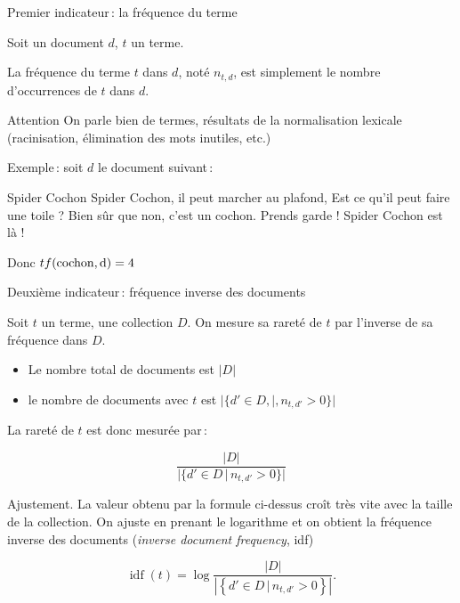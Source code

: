 \begin{frame}[fragile]{Premier indicateur\,: la \alert{fréquence du terme}}

Soit un document $d$, $t$ un terme. 

\vfill

La \alert{fréquence} du terme $t$ dans $d$,  noté $n_{t,d}$, est simplement
le nombre d'occurrences de $t$ dans $d$.

\begin{noteblock}{Attention}
On parle bien de \alert{termes}, résultats de la normalisation lexicale (racinisation,
élimination des mots inutiles, etc.)
\end{noteblock}

\vfill

Exemple\,: soit $d$ le document  suivant\,:

\begin{smallverbatim}
Spider Cochon Spider Cochon, il peut marcher au plafond, 
Est ce qu'il peut faire une toile ? Bien sûr que non, 
c'est un cochon. Prends garde ! Spider Cochon est là !
\end{smallverbatim}

\medskip

Donc $tf(\rm{cochon}, d)=4$

\end{frame}


\begin{frame}{Deuxième indicateur\,: \alert{fréquence inverse des documents}}

Soit $t$ un terme, une collection $D$. On mesure sa \alert{rareté} de $t$
par l'inverse de sa fréquence dans $D$.

\begin{itemize}

\item Le nombre total de documents est $|D|$ 

\item le nombre de documents avec $t$ est $|\{d'\in D, |, n_{t,d'}>0\}|$


\end{itemize}

\vfill

La rareté de $t$ est donc mesurée par\,:

$$\frac{|D|}{|\{d'\in D\,|\,n_{t,d'}>0\}|}$$

\vfill

\alert{Ajustement}. La valeur obtenu par la formule ci-dessus croît très vite avec la
taille de la collection. On ajuste en prenant le logarithme et on obtient
la \alert{fréquence inverse des documents} (\emph{inverse document frequency}, idf) 

\[\mathop{\mathrm{idf}}(t)=\log\frac{|D|}{\left|\left\{d'\in
D\,|\,n_{t,d'}>0\right\}\right|}.\]

\end{frame}

